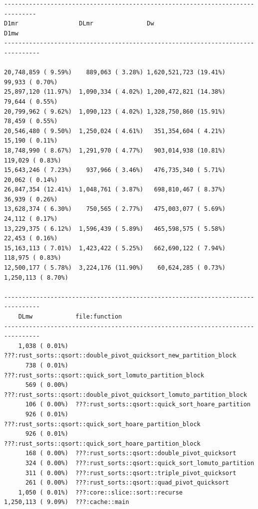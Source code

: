 \documentclass{article}
\begin{document}
\begin{verbatim}
------------------------------------------------------------------------------- 
D1mr                 DLmr               Dw                         D1mw           
--------------------------------------------------------------------------------

20,748,859 ( 9.59%)    889,063 ( 3.28%) 1,620,521,723 (19.41%)     99,933 ( 0.70%)      
25,897,120 (11.97%)  1,090,334 ( 4.02%) 1,200,472,821 (14.38%)     79,644 ( 0.55%)        
20,799,962 ( 9.62%)  1,090,123 ( 4.02%) 1,328,750,860 (15.91%)     78,459 ( 0.55%)        
20,546,480 ( 9.50%)  1,250,024 ( 4.61%)   351,354,604 ( 4.21%)     15,190 ( 0.11%)        
18,748,990 ( 8.67%)  1,291,970 ( 4.77%)   903,014,938 (10.81%)    119,029 ( 0.83%)        
15,643,246 ( 7.23%)    937,966 ( 3.46%)   476,735,340 ( 5.71%)     20,062 ( 0.14%)        
26,847,354 (12.41%)  1,048,761 ( 3.87%)   698,810,467 ( 8.37%)     36,939 ( 0.26%)        
13,628,374 ( 6.30%)    750,565 ( 2.77%)   475,003,077 ( 5.69%)     24,112 ( 0.17%)        
13,229,375 ( 6.12%)  1,596,439 ( 5.89%)   465,598,575 ( 5.58%)     22,453 ( 0.16%)        
15,163,113 ( 7.01%)  1,423,422 ( 5.25%)   662,690,122 ( 7.94%)    118,975 ( 0.83%)      
12,500,177 ( 5.78%)  3,224,176 (11.90%)    60,624,285 ( 0.73%)  1,250,113 ( 8.70%)  

--------------------------------------------------------------------------------
    DLmw            file:function
--------------------------------------------------------------------------------
    1,038 ( 0.01%)  ???:rust_sorts::qsort::double_pivot_quicksort_new_partition_block
      738 ( 0.01%)  ???:rust_sorts::qsort::quick_sort_lomuto_partition_block
      569 ( 0.00%)  ???:rust_sorts::qsort::double_pivot_quicksort_lomuto_partition_block
      106 ( 0.00%)  ???:rust_sorts::qsort::quick_sort_hoare_partition
      926 ( 0.01%)  ???:rust_sorts::qsort::quick_sort_hoare_partition_block
      926 ( 0.01%)  ???:rust_sorts::qsort::quick_sort_hoare_partition_block
      168 ( 0.00%)  ???:rust_sorts::qsort::double_pivot_quicksort
      324 ( 0.00%)  ???:rust_sorts::qsort::quick_sort_lomuto_partition
      311 ( 0.00%)  ???:rust_sorts::qsort::triple_pivot_quicksort
      261 ( 0.00%)  ???:rust_sorts::qsort::quad_pivot_quicksort
    1,050 ( 0.01%)  ???:core::slice::sort::recurse
1,250,113 ( 9.09%)  ???:cache::main
\end{verbatim}
\end{document}
